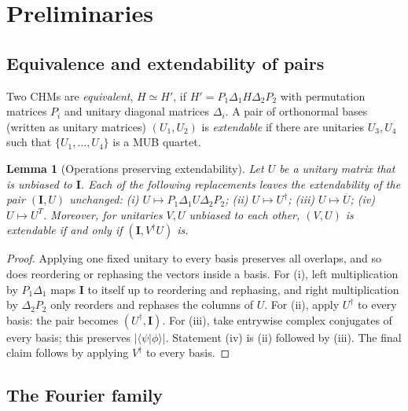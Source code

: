 \documentclass[11pt]{article}
\numberwithin{equation}{section}
\theoremstyle{plain}
\newtheorem{lemma}[theorem]{Lemma}
\theoremstyle{definition}
\theoremstyle{remark}
\newcommand{\I}{\mathbf{I}}
\newcommand{\dg}{^{\dagger}}
\begin{document}
\section{Preliminaries}\label{sec:prelim}

\subsection{Equivalence and extendability of pairs}

Two CHMs are \emph{equivalent}, $H\simeq H'$, if $H'=P_1\Delta_1H\Delta_2P_2$ with permutation matrices $P_i$ and unitary diagonal matrices $\Delta_i$. A pair of orthonormal bases (written as unitary matrices) $(U_1,U_2)$ is \emph{extendable} if there are unitaries $U_3,U_4$ such that $\{U_1,\dots,U_4\}$ is a MUB quartet.

\begin{lemma}[Operations preserving extendability]\label{lem:pair-ops}
Let $U$ be a unitary matrix that is unbiased to $\I$. Each of the following replacements leaves the extendability of the pair $(\I,U)$ unchanged:
(i) $U\mapsto P_1\Delta_1U\Delta_2P_2$;
(ii) $U\mapsto U\dg$;
(iii) $U\mapsto\overline U$;
(iv) $U\mapsto U^{T}$.
Moreover, for unitaries $V,U$ unbiased to each other, $(V,U)$ is extendable if and only if $(\I,V\dg U)$ is.
\end{lemma}

\begin{proof}
Applying one fixed unitary to every basis preserves all overlaps, and so does reordering or rephasing the vectors inside a basis. For (i), left multiplication by $P_1\Delta_1$ maps $\I$ to itself up to reordering and rephasing, and right multiplication by $\Delta_2P_2$ only reorders and rephases the columns of $U$. For (ii), apply $U\dg$ to every basis: the pair becomes $(U\dg,\I)$. For (iii), take entrywise complex conjugates of every basis; this preserves $|\langle\psi|\phi\rangle|$. Statement (iv) is (ii) followed by (iii). The final claim follows by applying $V\dg$ to every basis.
\end{proof}

\subsection{The Fourier family}
\end{document}
